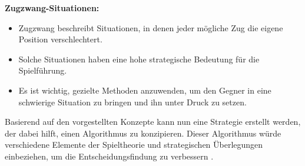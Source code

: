 \textbf{Zugzwang-Situationen:}
\begin{itemize}
	\item Zugzwang beschreibt Situationen, in denen jeder mögliche Zug die eigene Position verschlechtert.
	\item Solche Situationen haben eine hohe strategische Bedeutung für die Spielführung.
	\item Es ist wichtig, gezielte Methoden anzuwenden, um den Gegner in eine schwierige Situation zu bringen und ihn unter Druck zu setzen.
\end{itemize}

Basierend auf den vorgestellten Konzepte kann nun eine Strategie erstellt werden, der dabei hilft, einen Algorithmus zu konzipieren. Dieser Algorithmus würde verschiedene Elemente der Spieltheorie und strategischen Überlegungen einbeziehen, um die Entscheidungsfindung zu verbessern \autocites{monien_alphabeta-algorithmus_2008}.